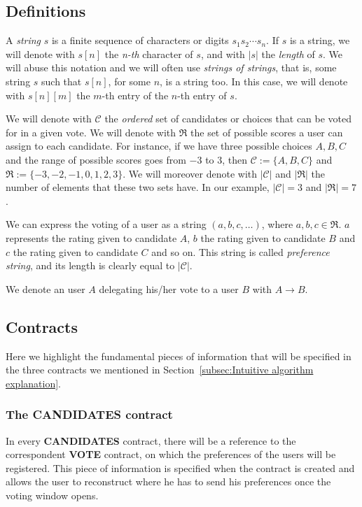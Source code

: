 \documentclass[submission, copyright,creativecommons,sharealike,noncommercial]{eptcs}
\newcommand{\candidates}{\ensuremath{\mathcal{C}} \xspace}
\newcommand{\range}{\ensuremath{\mathfrak{R}}\xspace}
\newcommand{\Candidates}{\textbf{CANDIDATES}\xspace}
\newcommand{\Vote}{\textbf{VOTE}\xspace}
\begin{document}
\subsection{Definitions}\label{subsec:Definitions}
%
	\begin{definition}
		A \emph{string} $s$ is a finite sequence of characters or digits $s_1 s_2 \cdots s_n$. If $s$ is a string, we will denote with $s[n]$ the \emph{n-th} character of $s$, and with $|s|$ the \emph{length} of $s$. We will abuse this notation and we will often use \emph{strings of strings}, that is, some string $s$ such that $s[n]$, for some $n$, is a string too. In this case, we will denote with $s[n][m]$ the $m$-th entry of the $n$-th entry of $s$.
	\end{definition}	
%	
	\begin{definition}\label{def:candidates and range}
		We will denote with \candidates the \emph{ordered} set of candidates or choices that can be voted for in a given vote. We will denote with \range the set of possible scores a user can assign to each candidate. For instance, if we have three possible choices $A,B,C$ and the range of possible scores goes from $-3$ to $3$, then $\candidates := \{A, B, C\}$ and $\range := \{-3,-2,-1,0,1,2,3\}$. We will moreover denote with $| \candidates|$ and $|\range|$ the number of elements that these two sets have. In our example, $|\candidates | = 3$ and $|\range|=7$.
	\end{definition}
%	
	\begin{definition}\label{def:voting string}		
		We can express the voting of a user as a string $(a,b,c, \dots)$, where $a,b,c \in \range$. $a$ represents the rating given to candidate $A$, $b$ the rating given to candidate $B$ and $c$ the rating given to candidate $C$ and so on. This string is called \emph{preference string}, and its length is clearly equal to $|\candidates|$.
	\end{definition}
%
	\begin{definition}
 		We denote an user $A$ delegating his/her vote to a user $B$ with $A \to B$.
	\end{definition}
%
%
\subsection{Contracts}\label{subsec:Contracts}
%
Here we highlight the fundamental pieces of information that will be specified in the three contracts we mentioned in Section~\ref{subsec:Intuitive algorithm explanation}.
\subsubsection{The \Candidates contract}
	In every \Candidates contract, there will be a reference to the correspondent \Vote contract, on which the preferences of the users will be registered. This piece of information is specified when the contract is created and allows the user to reconstruct where he has to send his preferences once the voting window opens.
	
\end{document}
